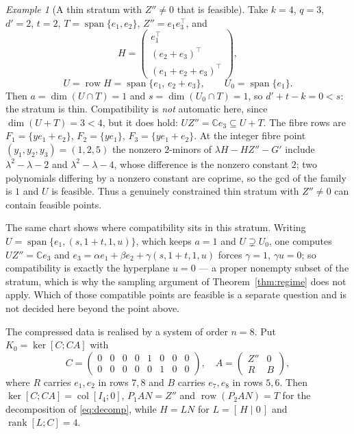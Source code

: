 \documentclass[journal]{IEEEtran}
\theoremstyle{plainn}
\theoremstyle{remark}
\newtheorem{example}[thm]{Example}
\begin{document}
\begin{example}[A thin stratum with $Z''\ne0$ that is feasible]\label{ex:thin-nonzero}
Take $k=4$, $q=3$, $d'=2$, $t=2$, $T=\operatorname{span}\{e_1,e_2\}$, $Z''=e_1e_3^{\top}$, and
$$H=\begin{pmatrix}e_1^{\top}\\ (e_2+e_3)^{\top}\\ (e_1+e_2+e_3)^{\top}\end{pmatrix},$$
$$U=\operatorname{row}H=\operatorname{span}\{e_1,\,e_2+e_3\},\qquad U_0=\operatorname{span}\{e_1\}.$$
Then $a=\dim(U\cap T)=1$ and $s=\dim(U_0\cap T)=1$, so $d'+t-k=0<s$: the stratum is thin.
Compatibility is \emph{not} automatic here, since $\dim(U+T)=3<4$, but it does hold:
$UZ''=\mathbb Ce_3\subseteq U+T$. The fibre rows are $F_1=\{ye_1+e_2\}$, $F_2=\{ye_1\}$,
$F_3=\{ye_1+e_2\}$. At the integer fibre point $(y_1,y_2,y_3)=(1,2,5)$ the nonzero $2$-minors of
$\lambda H-HZ''-G'$ include $\lambda^2-\lambda-2$ and $\lambda^2-\lambda-4$, whose difference is the
nonzero constant $2$; two polynomials differing by a nonzero constant are coprime, so the gcd of the
family is $1$ and $U$ is feasible. Thus a genuinely constrained thin stratum with $Z''\ne0$ can contain
feasible points.

The same chart shows where compatibility sits in this stratum. Writing
$U=\operatorname{span}\{e_1,(s,1+t,1,u)\}$, which keeps $a=1$ and $U\supsetneq U_0$, one computes
$UZ''=\mathbb Ce_3$ and $e_3=\alpha e_1+\beta e_2+\gamma(s,1+t,1,u)$ forces $\gamma=1$, $\gamma u=0$;
so compatibility is exactly the hyperplane $u=0$ --- a proper nonempty subset of the stratum, which is
why the sampling argument of Theorem~\ref{thm:regime} does not apply. Which of those compatible points
are feasible is a separate question and is not decided here beyond the point above.

The compressed data is realised by a system of order $n=8$. Put $K_0=\ker[C;CA]$ with
$$C=\begin{pmatrix}0&0&0&0&1&0&0&0\\0&0&0&0&0&1&0&0\end{pmatrix},\quad
A=\begin{pmatrix}Z''&0\\ R&B\end{pmatrix},$$
where $R$ carries $e_1,e_2$ in rows $7,8$ and $B$ carries $e_7,e_8$ in rows $5,6$. Then
$\ker[C;CA]=\operatorname{col}[I_4;0]$, $P_1AN=Z''$ and $\operatorname{row}(P_2AN)=T$ for the
decomposition of \eqref{eq:decomp}, while $H=LN$ for $L=[\,H\mid 0\,]$ and $\operatorname{rank}[L;C]=4$.
\end{example}
\end{document}
